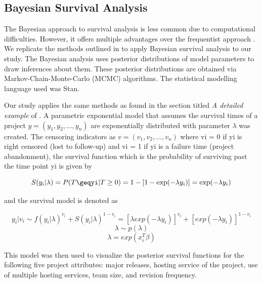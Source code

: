 \documentclass[acmconf]{acmart}
\begin{document}
\subsection{Bayesian Survival Analysis}

The Bayesian approach to survival analysis is less common due to computational difficulties. However, it offers multiple advantages over the frequentist approach \cite{kelter2020bayesian}. 
We replicate the methods outlined in \cite{kelter2020bayesian} to apply Bayesian survival analysis to our study. 
The Bayesian analysis uses posterior distributions of model parameters to draw inferences about them. 
These posterior distributions are obtained via Markov-Chain-Monte-Carlo (MCMC) algorithms. 
The statistical modelling language used was Stan.

Our study applies the same methods as found in the section titled \emph{A detailed example} of \cite{kelter2020bayesian}. A parametric exponential model that assumes the survival times of a project $y = (y_1, y_2, \dots, y_n)$ are exponentially distributed with parameter $\lambda$ was created. 
The censoring indicators as $v = (v_1, v_2,\dots, v_n)$ where vi = 0 if yi is right censored (lost to follow-up) and vi = 1 if yi is a failure time (project abandonment), the survival function which is the probability of surviving past the time point yi is given by

\begin{equation}
S(y_i|\lambda) = P(T\geqyi|T\geq0) = 1 - [1 - \exp(-  \lambda y_i)] = \exp(- \lambda y_i)
\end{equation}

and the survival model is denoted as

\begin{equation}
y_i|v_i \sim f(y_i| \lambda)^{v_i} + S(y_i| \lambda)^{1-v_i} = [\lambda exp(-  \lambda y_i)]^{v_i} + [exp(-  \lambda y_i)]^{1-v_i}
\end{equation}
\begin{equation}
\lambda \sim p(\lambda)
\end{equation}
\begin{equation}
\lambda = exp(x_i^T \beta)
\end{equation}

This model was then used to visualize the posterior survival functions for the following five project attributes: major releases, hosting service of the project, use of multiple hosting services, team size, and revision frequency. 

\end{document}
